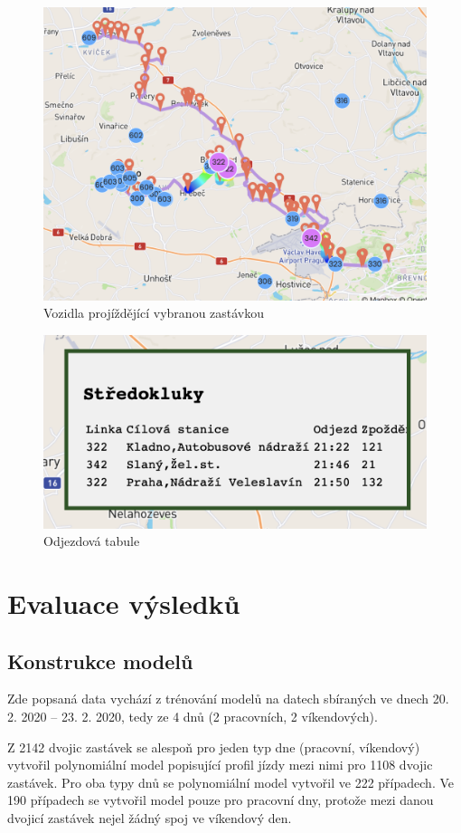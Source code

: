 \begin{figure}
   \centering
 \includegraphics[width=0.7\linewidth]{../img/more_trips.png}
 \caption{Vozidla projíždějící vybranou zastávkou}
 \label{fig:more_trips}
\end{figure}


\begin{figure}
   \centering
 \includegraphics[width=0.4\linewidth]{../img/stredokluky_table.png}
 \caption{Odjezdová tabule}
 \label{fig:stredokluky_table}
\end{figure}


\section{Evaluace výsledků}


\subsection{Konstrukce modelů}


Zde popsaná data vychází z trénování modelů na datech sbíraných ve dnech 20. 2. 2020 -- 23. 2. 2020, tedy ze 4 dnů (2 pracovních, 2 víkendových).


\bigbreak


Z 2142 dvojic zastávek se alespoň pro jeden typ dne (pracovní, víkendový) vytvořil polynomiální model popisující profil jízdy mezi nimi pro 1108 dvojic zastávek. Pro oba typy dnů se polynomiální model vytvořil ve 222 případech. Ve 190 případech se vytvořil model pouze pro pracovní dny, protože mezi danou dvojicí zastávek nejel žádný spoj ve víkendový den.


